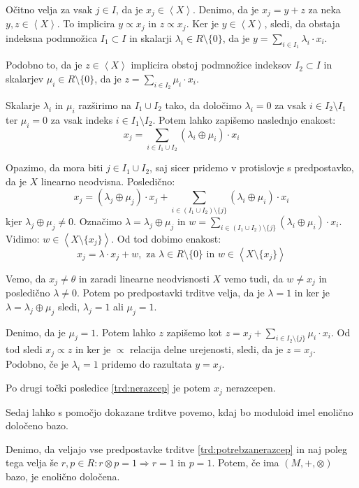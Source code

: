 \documentclass[mat1]{fmfdelo}
\newcommand{\Gen}[1]{\ensuremath{\left<{#1}\right>}}
\begin{document}
\begin{dokaz}
	Očitno velja za vsak $j\in I$, da je $x_j\in\Gen{X}$. Denimo, da je $x_j = y + z$ za neka $y, z\in\Gen{X}$. To implicira $y\varpropto x_j$ in $z\varpropto x_j$. 
	Ker je $y\in\Gen{X}$, sledi, da obstaja indeksna podmnožica $I_1 \subset I$ in skalarji $\lambda_i\in R\setminus\{0\}$, da je $y = \sum_{i \in I_1}\lambda_i\cdot x_i$. 
	
	Podobno to, da je $z\in\Gen{X}$ implicira obstoj podmnožice indeksov $I_2\subset I$ in skalarjev $\mu_i\in R\setminus\{0\}$, da je $z = \sum_{i\in I_2}\mu_i\cdot x_i$. 
	
	Skalarje $\lambda_i$ in $\mu_i$ razširimo na $I_1\cup I_2$ tako, da določimo $\lambda_i = 0$ za vsak $i\in I_2\setminus I_1$ ter $\mu_i = 0$ za vsak indeks $i\in I_1\setminus I_2$. Potem lahko zapišemo naslednjo enakost: $$x_j = \sum_{i\in I_1\cup I_2}(\lambda_i \oplus\mu_i)\cdot x_i$$
	
	Opazimo, da mora biti $j\in I_1\cup I_2$, saj sicer pridemo v protislovje s predpostavko, da je $X$ linearno neodvisna. Posledično: $$ x_j = (\lambda_j\oplus\mu_j)\cdot x_j + \sum_{i\in (I_1\cup I_2)\setminus\{j\}}(\lambda_i\oplus\mu_i)\cdot x_i $$
	kjer $\lambda_j\oplus\mu_j\neq 0$. Označimo $\lambda = \lambda_j\oplus\mu_j$ in $w = \sum_{i\in (I_1\cup I_2)\setminus\{j\}}(\lambda_i\oplus\mu_i)\cdot x_i$. Vidimo: $w\in\Gen{X\setminus\{x_j\}}$. Od tod dobimo enakost: $$x_j = \lambda\cdot x_j + w,\text{~za~} \lambda\in R\setminus\{0\}\text{~in~} w\in\Gen{X\setminus\{x_j\}} $$
	
	Vemo, da $x_j\neq \theta$ in zaradi linearne neodvisnosti $X$ vemo tudi, da $w\neq x_j$ in posledično $\lambda\neq 0$. Potem po predpostavki trditve velja, da je $\lambda = 1$ in ker je $\lambda = \lambda_j\oplus\mu_j$ sledi, $\lambda_j = 1$ ali $\mu_j = 1$. 
	
	Denimo, da je $\mu_j = 1$. Potem lahko $z$ zapišemo kot $z = x_j + \sum_{i\in I_2\setminus\{j\}}\mu_i\cdot x_i$. Od tod sledi $x_j\varpropto z$ in ker je $\varpropto$ relacija delne urejenosti, sledi, da je $z = x_j$. Podobno, če je $\lambda_i = 1$ pridemo do razultata $y = x_j$.
	
	Po drugi točki posledice \ref{trd:nerazcep} je potem $x_j$ nerazcepen.
\end{dokaz}

Sedaj lahko s pomočjo dokazane trditve povemo, kdaj bo moduloid imel enolično določeno bazo.

\begin{trditev}
	\label{trd:enoličbaza}
	Denimo, da veljajo vse predpostavke trditve \ref{trd:potrebzanerazcep} in naj poleg tega velja še $r, p\in R: r\otimes p = 1\Rightarrow r = 1$ in $p = 1$. Potem, če ima $(M, +, \otimes)$ bazo, je enolično določena.
\end{trditev}
\end{document}
